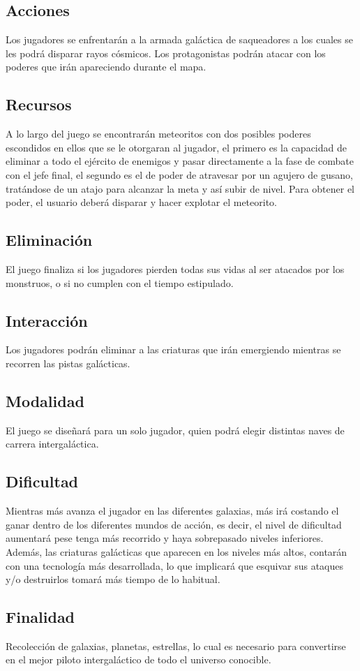 \documentclass{article}
\begin{document}
\subsection{Acciones}
Los jugadores se enfrentarán a la armada galáctica de saqueadores a los cuales se les podrá disparar rayos cósmicos. 
Los protagonistas podrán atacar con los poderes que irán apareciendo durante el mapa.

\subsection{Recursos}
A lo largo del juego se encontrarán meteoritos con dos posibles poderes escondidos en ellos que se le otorgaran al jugador, el primero es la capacidad de eliminar a todo el ejército de enemigos y pasar directamente a la fase de combate con el jefe final, el segundo es el de poder de atravesar por un agujero de gusano, tratándose de un atajo para alcanzar la meta y así subir de nivel. 
Para obtener el poder, el usuario deberá disparar y hacer explotar el meteorito.

\subsection{Eliminación}
El juego finaliza si los jugadores pierden todas sus vidas al ser atacados por los monstruos, o si no cumplen con el tiempo estipulado.

\subsection{Interacción}
Los jugadores podrán eliminar a las criaturas que irán emergiendo mientras se recorren las pistas galácticas.

\subsection{Modalidad}
El juego se diseñará para un solo jugador, quien podrá elegir distintas naves de carrera intergaláctica.

\subsection{Dificultad}
Mientras más avanza el jugador en las diferentes galaxias, más irá costando el ganar dentro de los diferentes mundos de acción, es decir, el nivel de dificultad aumentará pese tenga más recorrido y haya sobrepasado niveles inferiores. Además, las criaturas galácticas que aparecen en los niveles más altos, contarán con una tecnología más desarrollada, lo que implicará que esquivar sus ataques y/o destruirlos tomará más tiempo de lo habitual. 

\subsection{Finalidad}
Recolección de galaxias, planetas, estrellas, lo cual es necesario para convertirse en el mejor piloto intergaláctico de todo el universo conocible. 
\newpage



\cite{calistenia}
\end{document}
